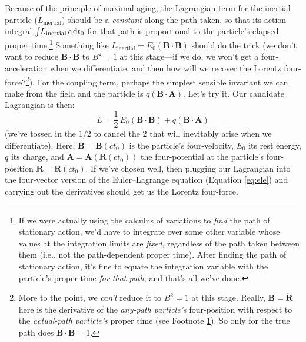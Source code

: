 \documentclass[12pt]{article}
\renewcommand{\vv}[1]{\mathbf{#1}}
\newcommand{\dd}[1]{\mathrm{d}#1}
\begin{document}
Because of the principle of maximal aging, the Lagrangian term for the inertial particle ($L_{\textrm{inertial}}$) should be a \emph{constant} along the path taken, so that its action integral $\int \mkern-4mu L_{\textrm{inertial}} \, c \, \dd t_0$ for that path is proportional to the particle's elapsed proper time.\footnote{\label{fn:covpt}If we were actually using the calculus of variations to \emph{find} the path of stationary action, we'd have to integrate over some other variable whose values at the integration limits are \emph{fixed}, regardless of the path taken between them (i.e., not the path-dependent proper time). After finding the path of stationary action, it's fine to equate the integration variable with the particle's proper time \emph{for that path}, and that's all we've done.} Something like $L_{\textrm{inertial}} = E_0 (\vv B \cdot \vv B)$ should do the trick (we don't want to reduce $\vv B \cdot \vv B$ to $B^2 = 1$ at this stage---if we do, we won't get a four-acceleration when we differentiate, and then how will we recover the Lorentz four-force?\footnote{\label{fn:bb1}More to the point, we \emph{can't} reduce it to $B^2 = 1$ at this stage. Really, $\vv B = \mathring{\vv R}$ here is the derivative of the \emph{any-path particle's} four-position with respect to the \emph{actual-path particle's} proper time (see Footnote \ref{fn:covpt}). So only for the true path does $\vv B \cdot \vv B = 1$.}). For the coupling term, perhaps the simplest sensible invariant we can make from the field and the particle is $q (\vv B \cdot \vv A)$. Let's try it. Our candidate Lagrangian is then:
\begin{equation*}
L = \dfrac{1}{2} \, E_0 (\vv B \cdot \vv B) + q (\vv B \cdot \vv A)
\end{equation*}
(we've tossed in the $1/2$ to cancel the $2$ that will inevitably arise when we differentiate). Here, $\vv B = \vv B (ct_0)$ is the particle's four-velocity, $E_0$ its rest energy, $q$ its charge, and $\vv A = \vv A (\vv R (ct_0))$ the four-potential at the particle's four-position $\vv R = \vv R (ct_0)$. If we've chosen well, then plugging our Lagrangian into the four-vector version of the Euler--Lagrange equation (Equation \ref{eq:ele}) and carrying out the derivatives should get us the Lorentz four-force.
\end{document}
